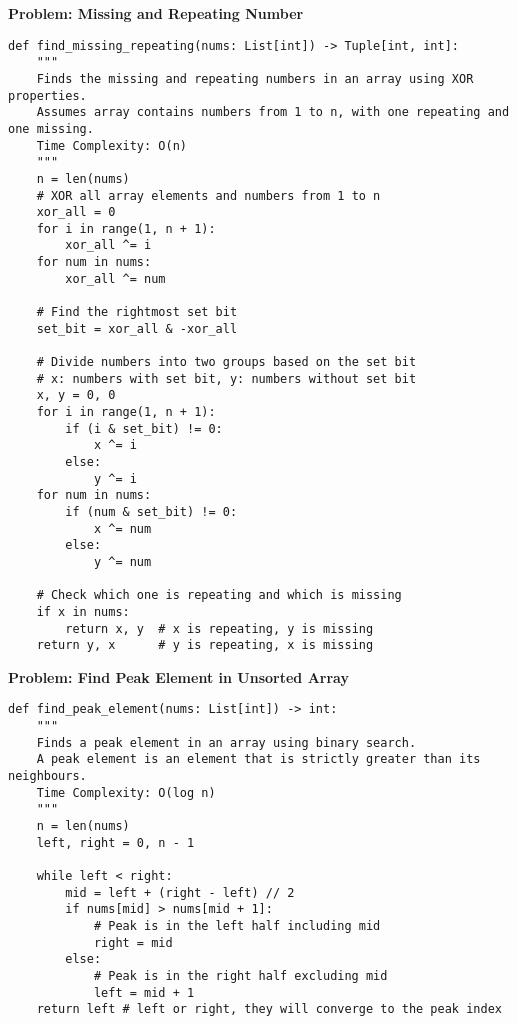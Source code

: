 \noindent\textbf{Problem: Missing and Repeating Number}
\begin{verbatim}
def find_missing_repeating(nums: List[int]) -> Tuple[int, int]:
    """
    Finds the missing and repeating numbers in an array using XOR properties.
    Assumes array contains numbers from 1 to n, with one repeating and one missing.
    Time Complexity: O(n)
    """
    n = len(nums)
    # XOR all array elements and numbers from 1 to n
    xor_all = 0
    for i in range(1, n + 1):
        xor_all ^= i
    for num in nums:
        xor_all ^= num

    # Find the rightmost set bit
    set_bit = xor_all & -xor_all

    # Divide numbers into two groups based on the set bit
    # x: numbers with set bit, y: numbers without set bit
    x, y = 0, 0
    for i in range(1, n + 1):
        if (i & set_bit) != 0:
            x ^= i
        else:
            y ^= i
    for num in nums:
        if (num & set_bit) != 0:
            x ^= num
        else:
            y ^= num

    # Check which one is repeating and which is missing
    if x in nums:
        return x, y  # x is repeating, y is missing
    return y, x      # y is repeating, x is missing
\end{verbatim}

\noindent\textbf{Problem: Find Peak Element in Unsorted Array}
\begin{verbatim}
def find_peak_element(nums: List[int]) -> int:
    """
    Finds a peak element in an array using binary search.
    A peak element is an element that is strictly greater than its neighbours.
    Time Complexity: O(log n)
    """
    n = len(nums)
    left, right = 0, n - 1

    while left < right:
        mid = left + (right - left) // 2
        if nums[mid] > nums[mid + 1]:
            # Peak is in the left half including mid
            right = mid
        else:
            # Peak is in the right half excluding mid
            left = mid + 1
    return left # left or right, they will converge to the peak index
\end{verbatim}

